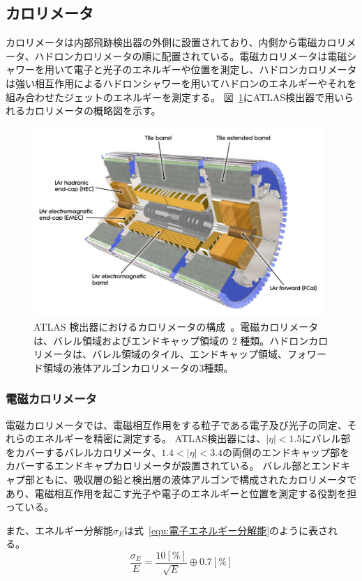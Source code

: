 \subsection{カロリメータ}
カロリメータは内部飛跡検出器の外側に設置されており、内側から電磁カロリメータ、ハドロンカロリメータの順に配置されている。電磁カロリメータは電磁シャワーを用いて電子と光子のエネルギーや位置を測定し、ハドロンカロリメータは強い相互作用によるハドロンシャワーを用いてハドロンのエネルギーやそれを組み合わせたジェットのエネルギーを測定する。
図~\ref{fig:カロリメータ}にATLAS検出器で用いられるカロリメータの概略図を示す。

\begin{figure}[tb]
  \centering
  \includegraphics[clip, width=11cm]{fig/2/Calorimeter_d3.pdf}
  \caption{ATLAS 検出器におけるカロリメータの構成~\cite{Aad:1129811}。電磁カロリメータは、バレル領域およびエンドキャップ領域の 2 種類。ハドロンカロリメータは、バレル領域のタイル、エンドキャップ領域、フォワード領域の液体アルゴンカロリメータの3種類。}
  \label{fig:カロリメータ}
\end{figure}

\subsubsection{電磁カロリメータ}
電磁カロリメータでは、電磁相互作用をする粒子である電子及び光子の同定、それらのエネルギーを精密に測定する。
ATLAS検出器には、$|\eta|<1.5$にバレル部をカバーするバレルカロリメータ、$1.4<|\eta|<3.4$の両側のエンドキャップ部をカバーするエンドキャプカロリメータが設置されている。
バレル部とエンドキャプ部ともに、吸収層の鉛と検出層の液体アルゴンで構成されたカロリメータであり、電磁相互作用を起こす光子や電子のエネルギーと位置を測定する役割を担っている。

また、エネルギー分解能$\sigma_{E}$は式~\eqref{equ:電子エネルギー分解能}のように表される。
\begin{equation}
    \frac{\sigma_{E}}{E} = \frac{10 [\%]}{\sqrt{E}}\oplus 0.7 [\%]
　\label{equ:電子エネルギー分解能}
\end{equation}



